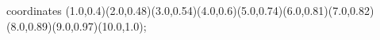 					coordinates { (1.0,0.4)(2.0,0.48)(3.0,0.54)(4.0,0.6)(5.0,0.74)(6.0,0.81)(7.0,0.82)(8.0,0.89)(9.0,0.97)(10.0,1.0)};